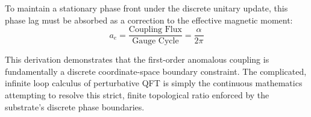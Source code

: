 To maintain a stationary phase front under the discrete unitary update, this phase lag must be absorbed as a correction to the effective magnetic moment:
\begin{equation}
a_e = \frac{\text{Coupling Flux}}{\text{Gauge Cycle}} = \frac{\alpha}{2\pi}
\end{equation}

This derivation demonstrates that the first-order anomalous coupling is fundamentally a discrete coordinate-space boundary constraint. The complicated, infinite loop calculus of perturbative QFT is simply the continuous mathematics attempting to resolve this strict, finite topological ratio enforced by the substrate's discrete phase boundaries.